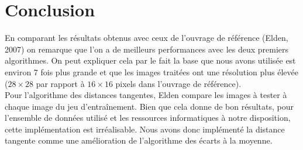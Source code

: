 \documentclass[a4paper,11pt,twoside]{report}
\begin{document}
\chapter{Conclusion}
En comparant les résultats obtenus avec ceux de l'ouvrage de référence (Elden, 2007) on remarque que l'on a de meilleurs performances avec les deux premiers algorithmes. On peut expliquer cela par le fait la base que nous avons utilisée est environ 7 fois plus grande et que les images traitées ont une résolution plus élevée ($28\times 28$ par rapport à $16\times 16$ pixels dans l'ouvrage de référence).\\
Pour l'algorithme des distances tangentes, Elden compare les images à tester à chaque image du jeu d'entraînement. Bien que cela donne de bon résultats, pour l'ensemble de données utilisé et les ressources informatiques à notre disposition, cette implémentation est irréalisable. Nous avons donc implémenté la distance tangente comme une amélioration de l'algorithme des écarts à la moyenne.



\end{document}
